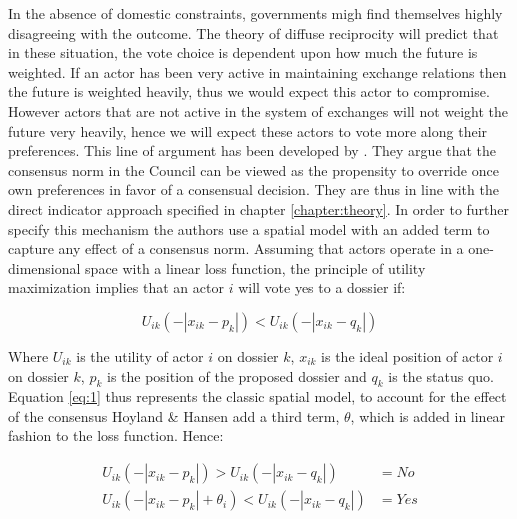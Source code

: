In the absence of domestic constraints, governments migh find themselves highly disagreeing with the outcome. The theory of diffuse reciprocity will predict that in these situation, the vote choice is dependent upon how much the future is weighted. If an actor has been very active in maintaining exchange relations then the future is weighted heavily, thus we would expect this actor to compromise. However actors that are not active in the system of exchanges will not weight the future very heavily, hence we will expect these actors to vote more along their preferences. This line of argument has been developed by \citet{HoylandHansen2010}. They argue that the consensus norm in the Council can be viewed as the propensity to override once own preferences in favor of a consensual decision. They are thus in line with the direct indicator approach specified in chapter \ref{chapter:theory}. In order to further specify this mechanism the authors use a spatial model with an added term to capture any effect of a consensus norm. Assuming that actors operate in a one-dimensional space with a linear loss function, the principle of utility maximization implies that an actor $i$ will vote yes to a dossier if:

\begin{equation}
  \label{eq:1}
  U_{ik}(-|x_{ik} - p_k|) < U_{ik}(-|x_{ik} - q_k|)
\end{equation}

Where $U_{ik}$ is the utility of actor $i$ on dossier $k$, $x_{ik}$ is the ideal position of actor $i$ on dossier $k$, $p_k$ is the position of the proposed dossier and $q_k$ is the status quo. Equation \ref{eq:1} thus represents the classic spatial model, to account for the effect of the consensus Hoyland \& Hansen add a third term, $\theta$, which is added in linear fashion to the loss function. Hence:

\begin{align}
  \label{eq:2}
  U_{ik}(-|x_{ik} - p_k|) > U_{ik}(-|x_{ik} - q_k|) &= No \\
  U_{ik}(-|x_{ik} - p_k| + \theta_i) < U_{ik}(-|x_{ik} - q_k|) &= Yes
\end{align}

